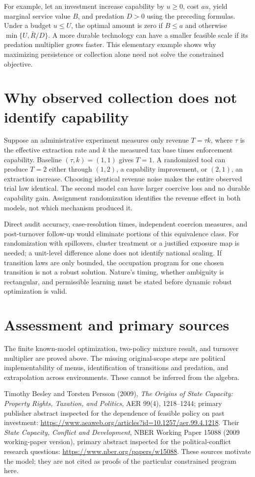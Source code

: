 \documentclass[11pt]{article}
\begin{document}
For example, let an investment increase capability by $u\geq0$, cost $au$, yield marginal service value $B$, and predation $D>0$ using the preceding formulas. Under a budget $u\leq U$, the optimal amount is zero if $B\leq a$ and otherwise $\min\{U,\bar R/D\}$. A more durable technology can have a smaller feasible scale if its predation multiplier grows faster. This elementary example shows why maximizing persistence or collection alone need not solve the constrained objective.

\section{Why observed collection does not identify capability}
Suppose an administrative experiment measures only revenue $T=\tau k$, where $\tau$ is the effective extraction rate and $k$ the measured tax base times enforcement capability. Baseline $(\tau,k)=(1,1)$ gives $T=1$. A randomized tool can produce $T=2$ either through $(1,2)$, a capability improvement, or $(2,1)$, an extraction increase. Choosing identical revenue noise makes the entire observed trial law identical. The second model can have larger coercive loss and no durable capability gain. Assignment randomization identifies the revenue effect in both models, not which mechanism produced it.

Direct audit accuracy, case-resolution times, independent coercion measures, and post-turnover follow-up would eliminate portions of this equivalence class. For randomization with spillovers, cluster treatment or a justified exposure map is needed; a unit-level difference alone does not identify national scaling. If transition laws are only bounded, the occupation program for one chosen transition is not a robust solution. Nature's timing, whether ambiguity is rectangular, and permissible learning must be stated before dynamic robust optimization is valid.

\section{Assessment and primary sources}
The finite known-model optimization, two-policy mixture result, and turnover multiplier are proved above. The missing original-scope steps are political implementability of menus, identification of transitions and predation, and extrapolation across environments. These cannot be inferred from the algebra.

Timothy Besley and Torsten Persson (2009), \emph{The Origins of State Capacity: Property Rights, Taxation, and Politics}, AER 99(4), 1218--1244; primary publisher abstract inspected for the dependence of feasible policy on past investment:
\url{https://www.aeaweb.org/articles?id=10.1257/aer.99.4.1218}.
Their \emph{State Capacity, Conflict and Development}, NBER Working Paper 15088 (2009 working-paper version), primary abstract inspected for the political-conflict research questions:
\url{https://www.nber.org/papers/w15088}. These sources motivate the model; they are not cited as proofs of the particular constrained program here.
\end{document}
